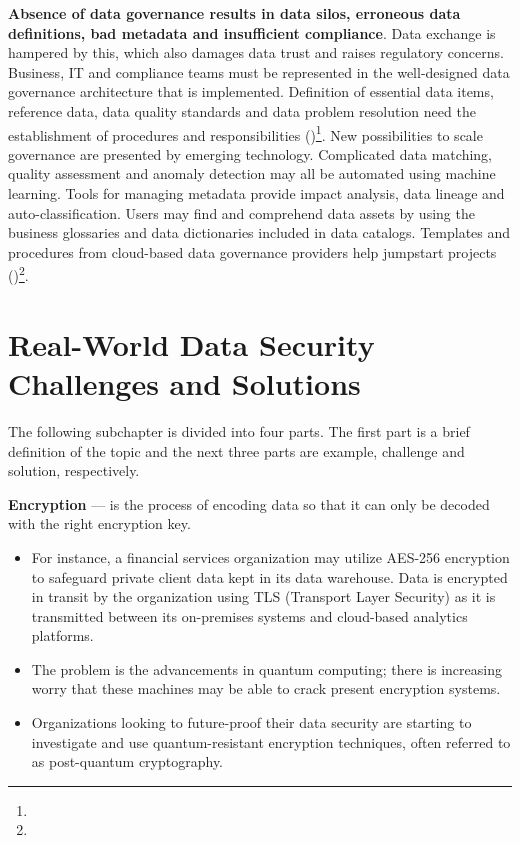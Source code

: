 \textbf{Absence of data governance results in data silos, erroneous data definitions, bad metadata and insufficient compliance}. Data exchange is hampered by this, which also damages data trust and raises regulatory concerns. Business, IT and compliance teams must be represented in the well-designed data governance architecture that is implemented. Definition of essential data items, reference data, data quality standards and data problem resolution need the establishment of procedures and responsibilities (\cite{Xie2021SolutionIA})\footnote[24]{}. New possibilities to scale governance are presented by emerging technology. Complicated data matching, quality assessment and anomaly detection may all be automated using machine learning. Tools for managing metadata provide impact analysis, data lineage and auto-classification. Users may find and comprehend data assets by using the business glossaries and data dictionaries included in data catalogs. Templates and procedures from cloud-based data governance providers help jumpstart projects (\cite{Achanta2023DataGA})\footnote[23]{}.

\section{Real-World Data Security Challenges and Solutions}

The following subchapter is divided into four parts. The first part is a brief definition of the topic and the next three parts are example, challenge and solution, respectively.

\textbf{Encryption} — is the process of encoding data so that it can only be decoded with the right encryption key.

\begin{itemize}
    \item For instance, a financial services organization may utilize AES-256 encryption to safeguard private client data kept in its data warehouse. Data is encrypted in transit by the organization using TLS (Transport Layer Security) as it is transmitted between its on-premises systems and cloud-based analytics platforms.
    \item The problem is the advancements in quantum computing; there is increasing worry that these machines may be able to crack present encryption systems.
    \item Organizations looking to future-proof their data security are starting to investigate and use quantum-resistant encryption techniques, often referred to as post-quantum cryptography.
\end{itemize}

